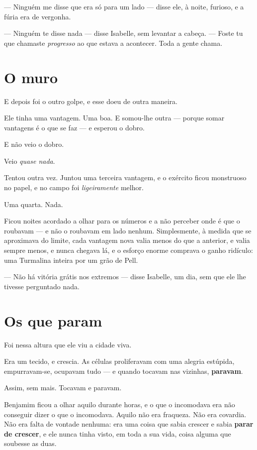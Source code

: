 \documentclass[livro.tex]{subfiles}
\begin{document}
\medskip

--- Ninguém me disse que era só para um lado --- disse ele, à noite, furioso, e a fúria era de vergonha.

--- Ninguém te disse nada --- disse Isabelle, sem levantar a cabeça. --- Foste tu que chamaste \emph{progresso} ao
que estava a acontecer. Toda a gente chama.

\section*{O muro}

E depois foi o outro golpe, e esse doeu de outra maneira.

Ele tinha uma vantagem. Uma boa. E somou-lhe outra --- porque somar vantagens é o que se faz --- e esperou o dobro.

E não veio o dobro.

Veio \emph{quase nada}.

\medskip

Tentou outra vez. Juntou uma terceira vantagem, e o exército ficou monstruoso no papel, e no campo foi
\emph{ligeiramente} melhor.

Uma quarta. Nada.

\medskip

Ficou noites acordado a olhar para os números e a não perceber onde é que o roubavam --- e não o roubavam em lado
nenhum. Simplesmente, à medida que se aproximava do limite, cada vantagem nova valia menos do que a anterior, e
valia sempre menos, e nunca chegava lá, e o esforço enorme comprava o ganho ridículo: uma Turmalina inteira por um grão de Pell.

--- Não há vitória grátis nos extremos --- disse Isabelle, um dia, sem que ele lhe tivesse perguntado nada.

\section*{Os que param}

Foi nessa altura que ele viu a cidade viva.

Era um tecido, e crescia. As células proliferavam com uma alegria estúpida, empurravam-se, ocupavam tudo --- e
quando tocavam nas vizinhas, \textbf{paravam}.

Assim, sem mais. Tocavam e paravam.

Benjamim ficou a olhar aquilo durante horas, e o que o incomodava era não conseguir dizer o que o incomodava. Aquilo
não era fraqueza. Não era covardia. Não era falta de vontade nenhuma: era uma coisa que sabia crescer e sabia
\textbf{parar de crescer}, e ele nunca tinha visto, em toda a sua vida, coisa alguma que soubesse as duas.
\end{document}

